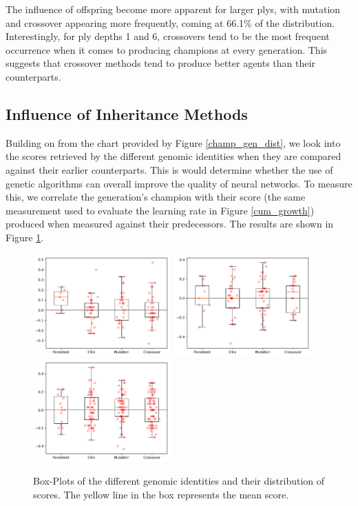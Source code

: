 \documentclass[12pt,a4paper]{article}
\begin{document}
        The influence of offspring become more apparent for larger plys, with mutation and crossover appearing more frequently, coming at 66.1\% of the distribution. Interestingly, for ply depths 1 and 6, crossovers tend to be the most frequent occurrence when it comes to producing champions at every generation. This suggests that crossover methods tend to produce better agents than their counterparts.

    \subsection{Influence of Inheritance Methods}
        Building on from the chart provided by Figure \ref{champ_gen_dist}, we look into the scores retrieved by the different genomic identities when they are compared against their earlier counterparts. This is would determine whether the use of genetic algorithms can overall improve the quality of neural networks. To measure this, we correlate the generation's champion with their score (the same measurement used to evaluate the learning rate in Figure \ref{cum_growth}) produced when measured against their predecessors. The results are shown in Figure \ref{champ_score_distribution}.

        \begin{figure}[!ht]
            \centering
            \includegraphics[width=53mm]{images/results/1ply/champ_score_distribution.pdf}
            \includegraphics[width=53mm]{images/results/3ply/champ_score_distribution.pdf}
            \includegraphics[width=53mm]{images/results/6ply/champ_score_distribution.pdf}
            \caption{Box-Plots of the different genomic identities and their distribution of scores. The yellow line in the box represents the mean score. \label{champ_score_distribution}}
        \end{figure}
\end{document}
